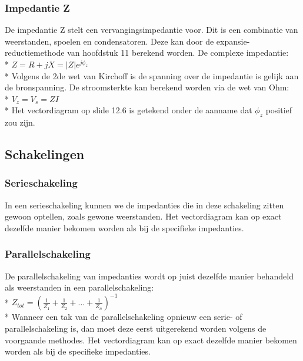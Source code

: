 \documentclass[10pt]{article}
\begin{document}
\subsubsection{Impedantie Z}
De impedantie Z stelt een vervangingsimpedantie voor. Dit is een combinatie van weerstanden, spoelen en condensatoren. Deze kan door de expansie-reductiemethode van hoofdstuk 11 berekend worden. De complexe impedantie:\\*
$Z = R + jX = |Z|e^{j\phi_z}$\\*
Volgens de 2de wet van Kirchoff is de spanning over de impedantie is gelijk aan de bronspanning. De stroomsterkte kan berekend worden via de wet van Ohm:\\*
$V_z = V_s = ZI$\\*
Het vectordiagram op slide 12.6 is getekend onder de aanname dat $\phi_z$ positief zou zijn.
\subsection{Schakelingen}
\subsubsection{Serieschakeling}
In een serieschakeling kunnen we de impedanties die in deze schakeling zitten gewoon optellen, zoals gewone weerstanden. Het vectordiagram kan op exact dezelfde manier bekomen worden als bij de specifieke impedanties.
\subsubsection{Parallelschakeling}
De parallelschakeling van impedanties wordt op juist dezelfde manier behandeld als weerstanden in een parallelschakeling:\\*
$Z_{tot} = (\frac{1}{Z_1} + \frac{1}{Z_2} + \dots + \frac{1}{Z_n})^{-1}$\\*
Wanneer een tak van de parallelschakeling opnieuw een serie- of parallelschakeling is, dan moet deze eerst uitgerekend worden volgens de voorgaande methodes. Het vectordiagram kan op exact dezelfde manier bekomen worden als bij de specifieke impedanties.
\end{document}
